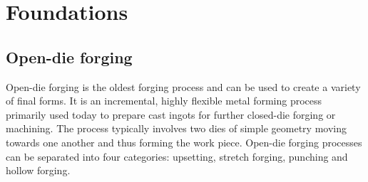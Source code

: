 \section{Foundations}

\subsection{Open-die forging}
Open-die forging is the oldest forging process and can be used to create a variety of final forms. It is an incremental, highly flexible metal forming process primarily used today to prepare cast ingots for further closed-die forging or machining. The process typically involves two dies of simple geometry moving towards one another and thus forming the work piece. Open-die forging processes can be separated into four categories: upsetting, stretch forging, punching and hollow forging. \cite{hbut}

